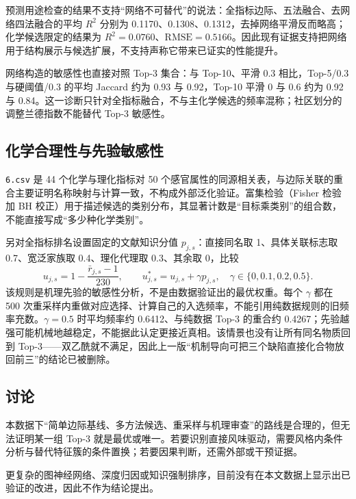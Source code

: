 \documentclass[UTF8,a4paper,zihao=-4]{ctexart}
\numberwithin{figure}{section}
\numberwithin{table}{section}
\numberwithin{equation}{section}
\newcommand{\file}[1]{\texttt{#1}}
\begin{document}
预测用途检查的结果不支持“网络不可替代”的说法：全指标边际、五法融合、去网络四法融合的平均 $R^2$ 分别为 0.1170、0.1308、0.1312，去掉网络平滑反而略高；化学候选限定的结果为 $R^2=0.0760$、$\mathrm{RMSE}=0.5166$。因此现有证据支持把网络用于结构展示与候选扩展，不支持声称它带来已证实的性能提升。

网络构造的敏感性也直接对照 Top-3 集合：与 Top-10、平滑 0.3 相比，Top-5/0.3 与硬阈值/0.3 的平均 Jaccard 约为 0.93 与 0.92，Top-10 平滑 0 与 0.6 约为 0.92 与 0.84。这一诊断只针对全指标融合，不与主化学候选的频率混称；社区划分的调整兰德指数不能替代 Top-3 敏感性。

\subsection{化学合理性与先验敏感性}

\file{6.csv} 是 44 个化学与理化指标对 50 个感官属性的同源相关表，与边际关联的重合主要证明名称映射与计算一致，不构成外部泛化验证。富集检验（Fisher 检验加 BH 校正）用于描述候选的类别分布，其显著计数是“目标乘类别”的组合数，不能直接写成“多少种化学类别”。

另对全指标排名设置固定的文献知识分值 $p_{j,s}$：直接同名取 1、具体关联标志取 0.7、宽泛家族取 0.4、理化代理取 0.3、其余取 0，比较
\begin{equation}
u_{j,s}=1-\frac{\bar r_{j,s}-1}{230},\qquad u^{*}_{j,s}=u_{j,s}+\gamma p_{j,s},\quad\gamma\in\{0,0.1,0.2,0.5\}.
\label{eq:prior}
\end{equation}
该规则是机理先验的敏感性分析，不是由数据验证出的最优权重。每个 $\gamma$ 都在 500 次重采样内重做对应选择、计算自己的入选频率，不能引用纯数据规则的旧频率充数。$\gamma=0.5$ 时平均频率约 0.6412、与纯数据 Top-3 的重合约 0.4267；先验越强可能机械地越稳定，不能据此认定更接近真相。该情景也没有让所有同名物质回到 Top-3——双乙酰就不满足，因此上一版“机制导向可把三个缺陷直接化合物放回前三”的结论已被删除。

\subsection{讨论}

本数据下“简单边际基线、多方法候选、重采样与机理审查”的路线是合理的，但无法证明某一组 Top-3 就是最优或唯一。若要识别直接风味驱动，需要风格内条件分析与替代特征簇的条件置换；若要因果判断，还需外部或干预证据。

更复杂的图神经网络、深度归因或知识强制排序，目前没有在本文数据上显示出已验证的改进，因此不作为结论提出。

\end{document}
